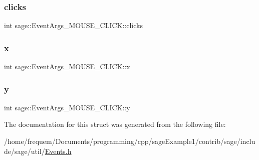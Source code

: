 \subsubsection{\texorpdfstring{clicks}{clicks}}
{\footnotesize\ttfamily int sage\+::\+Event\+Args\+\_\+\+M\+O\+U\+S\+E\+\_\+\+C\+L\+I\+C\+K\+::clicks}

\mbox{\label{structsage_1_1EventArgs__MOUSE__CLICK_a8181ddab316ffee1746237d6a496c1e5}} 
\subsubsection{\texorpdfstring{x}{x}}
{\footnotesize\ttfamily int sage\+::\+Event\+Args\+\_\+\+M\+O\+U\+S\+E\+\_\+\+C\+L\+I\+C\+K\+::x}

\mbox{\label{structsage_1_1EventArgs__MOUSE__CLICK_a77476820a4ddd808f1a77a98146f74e6}} 
\subsubsection{\texorpdfstring{y}{y}}
{\footnotesize\ttfamily int sage\+::\+Event\+Args\+\_\+\+M\+O\+U\+S\+E\+\_\+\+C\+L\+I\+C\+K\+::y}



The documentation for this struct was generated from the following file\+:\begin{DoxyCompactItemize}
\item 
/home/frequem/\+Documents/programming/cpp/sage\+Example1/contrib/sage/include/sage/util/\mbox{\hyperlink{Events_8h}{Events.\+h}}\end{DoxyCompactItemize}
